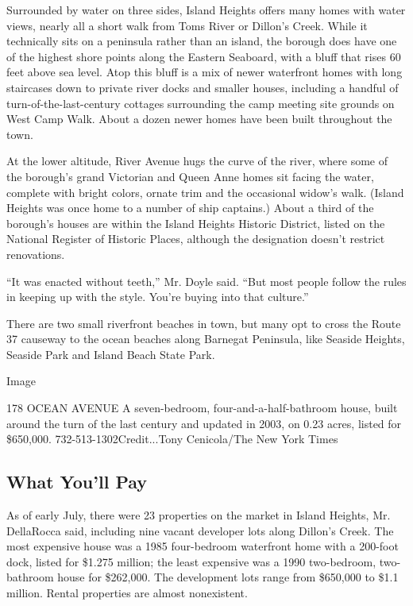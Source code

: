 Surrounded by water on three sides, Island Heights offers many homes
with water views, nearly all a short walk from Toms River or Dillon's
Creek. While it technically sits on a peninsula rather than an island,
the borough does have one of the highest shore points along the Eastern
Seaboard, with a bluff that rises 60 feet above sea level. Atop this
bluff is a mix of newer waterfront homes with long staircases down to
private river docks and smaller houses, including a handful of
turn-of-the-last-century cottages surrounding the camp meeting site
grounds on West Camp Walk. About a dozen newer homes have been built
throughout the town.

At the lower altitude, River Avenue hugs the curve of the river, where
some of the borough's grand Victorian and Queen Anne homes sit facing
the water, complete with bright colors, ornate trim and the occasional
widow's walk. (Island Heights was once home to a number of ship
captains.) About a third of the borough's houses are within the Island
Heights Historic District, listed on the National Register of Historic
Places, although the designation doesn't restrict renovations.

``It was enacted without teeth,'' Mr. Doyle said. ``But most people
follow the rules in keeping up with the style. You're buying into that
culture.''

There are two small riverfront beaches in town, but many opt to cross
the Route 37 causeway to the ocean beaches along Barnegat Peninsula,
like Seaside Heights, Seaside Park and Island Beach State Park.

Image

178 OCEAN AVENUE \textbar{} A seven-bedroom, four-and-a-half-bathroom
house, built around the turn of the last century and updated in 2003, on
0.23 acres, listed for \$650,000. 732-513-1302Credit...Tony Cenicola/The
New York Times

\hypertarget{what-youll-pay}{%
\subsection{What You'll Pay}\label{what-youll-pay}}

As of early July, there were 23 properties on the market in Island
Heights, Mr. DellaRocca said, including nine vacant developer lots along
Dillon's Creek. The most expensive house was a 1985 four-bedroom
waterfront home with a 200-foot dock, listed for \$1.275 million; the
least expensive was a 1990 two-bedroom, two-bathroom house for
\$262,000. The development lots range from \$650,000 to \$1.1 million.
Rental properties are almost nonexistent.

